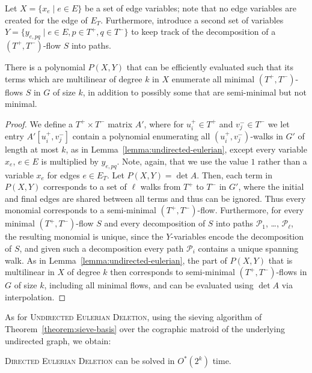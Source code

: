 \documentclass{theoretics}
\newcommand{\cP}{\ensuremath{\mathcal P}\xspace}
\begin{document}
Let $X=\{x_e \mid e \in E\}$ be a set of edge variables; note that no edge variables are created
for the edge of $E_T$. Furthermore, introduce a second set of variables
$Y=\{y_{e,pq} \mid e \in E, p \in T^+, q \in T^-\}$ to keep track of the decomposition of a $(T^+,T^-)$-flow $S$ into paths.


\begin{lemma}
  \label{lemma:directed-eulerian}
  There is a polynomial $P(X,Y)$ that can be efficiently evaluated such that its terms which are
  multilinear of degree $k$ in $X$ enumerate all minimal $(T^+,T^-)$-flows $S$ in $G$ of size $k$,
  in addition to possibly some that are semi-minimal but not minimal.
\end{lemma}
\begin{proof}
  We define a $T^+ \times T^-$ matrix $A'$, where for $u_i^+ \in T^+$ and $v_j^- \in T^-$
  we let entry $A'[u_i^+, v_j^-]$ contain a polynomial enumerating all $(u_i^+,v_j^-)$-walks in $G'$ of length at most $k$, as in Lemma~\ref{lemma:undirected-eulerian}, except every variable $x_e$, $e \in E$ is multiplied by $y_{e,pq}$. Note, again, that we use the value $1$ rather than a variable $x_e$ for edges $e \in E_T$. 
  Let $P(X,Y) = \det A$.
  Then, each term in $P(X,Y)$ corresponds to a set of $\ell$ walks from $T^+$ to $T^-$ in $G'$, where the initial and final edges are shared 
  between all terms and thus can be ignored. Thus every monomial corresponds to a semi-minimal $(T^+,T^-)$-flow.
  Furthermore, for every minimal $(T^+,T^-)$-flow $S$ and every decomposition of $S$ into paths $\cP_1$, \ldots, $\cP_\ell$, 
  the resulting monomial is unique, since the $Y$-variables encode the decomposition of $S$, and given such a decomposition every path $\cP_i$ contains a unique spanning walk. 
  As in Lemma~\ref{lemma:undirected-eulerian}, the part of $P(X,Y)$ that is multilinear in $X$ of degree $k$
  then corresponds to semi-minimal $(T^+,T^-)$-flows in $G$ of size $k$, including all minimal flows, and can be evaluated using $\det A$ via interpolation. 
\end{proof}

As for \textsc{Undirected Eulerian Deletion}, using the sieving algorithm of Theorem~\ref{theorem:sieve-basis} over the cographic matroid of the underlying undirected graph, we obtain:

\begin{theorem}
  \textsc{Directed Eulerian Deletion} can be solved in $O^*(2^k)$ time.
\end{theorem}
\end{document}
